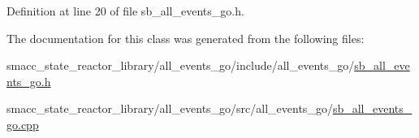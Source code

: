 Definition at line 20 of file sb\+\_\+all\+\_\+events\+\_\+go.\+h.



The documentation for this class was generated from the following files\+:\begin{DoxyCompactItemize}
\item 
smacc\+\_\+state\+\_\+reactor\+\_\+library/all\+\_\+events\+\_\+go/include/all\+\_\+events\+\_\+go/\hyperlink{sb__all__events__go_8h}{sb\+\_\+all\+\_\+events\+\_\+go.\+h}\item 
smacc\+\_\+state\+\_\+reactor\+\_\+library/all\+\_\+events\+\_\+go/src/all\+\_\+events\+\_\+go/\hyperlink{sb__all__events__go_8cpp}{sb\+\_\+all\+\_\+events\+\_\+go.\+cpp}\end{DoxyCompactItemize}
